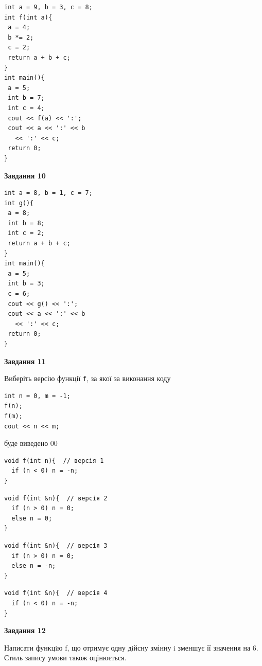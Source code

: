 \documentclass[12pt, ukrainian]{article}
\def\code#1{\Verb!#1!}
\begin{document}
{\begin {large}
\begin{minipage}[t]{7.0cm}
\begin{verbatim}
int a = 9, b = 3, c = 8;
int f(int a){
 a = 4;
 b *= 2;
 c = 2;
 return a + b + c;
}
int main(){
 a = 5;
 int b = 7;
 int c = 4;
 cout << f(a) << ':';
 cout << a << ':' << b 
   << ':' << c;
 return 0;
}
\end{verbatim}



\begin{center}
\textbf{Завдання 10}
\end{center}
\vspace{-8mm}

\begin{verbatim}
int a = 8, b = 1, c = 7;
int g(){
 a = 8;
 int b = 8;
 int c = 2;
 return a + b + c;
}
int main(){
 a = 5;
 int b = 3;
 c = 6;
 cout << g() << ':';
 cout << a << ':' << b 
   << ':' << c;
 return 0;
}
\end{verbatim}

\end{minipage}
\vline \hspace{1mm}
\begin{minipage}[t]{11.0cm}

\begin{center}
\textbf{Завдання 11}
\end{center}
Виберіть версію функції \code{f}, за якої за виконання коду
\begin{verbatim}
int n = 0, m = -1;
f(n);
f(m);
cout << n << m;
\end{verbatim}

буде виведено 00

\begin{verbatim}
void f(int n){  // версія 1
  if (n < 0) n = -n;
}
\end{verbatim}

\vspace{-8mm}\begin{verbatim}
void f(int &n){  // версія 2
  if (n > 0) n = 0;
  else n = 0;
}
\end{verbatim}

\vspace{-8mm}\begin{verbatim}
void f(int &n){  // версія 3
  if (n > 0) n = 0;
  else n = -n;
}
\end{verbatim}

\vspace{-8mm}\begin{verbatim}
void f(int &n){  // версія 4
  if (n < 0) n = -n;
}
\end{verbatim}



\begin{center}
\textbf{Завдання 12}
\end{center}

Написати функцiю f, що отримує одну дiйсну змінну i зменшує її значення на 6. Стиль запису умови також оцінюється.\par

\end{minipage}

\end {large}}
\newpage
\end{document}
